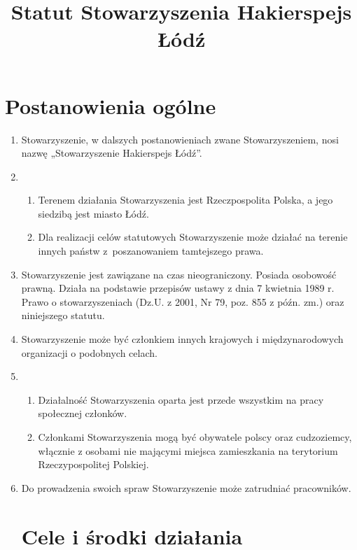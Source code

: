 \documentclass[chapterprefix,notitlepage]{article}
\begin{document}
\title{Statut Stowarzyszenia Hakierspejs Łódź}
\author{}
\date{}
\maketitle


\section{Postanowienia ogólne}

\begin{enumerate}

	\item Stowarzyszenie, w dalszych postanowieniach zwane Stowarzyszeniem, nosi nazwę „Stowarzyszenie Hakierspejs Łódź”.
	
	\item \begin{enumerate}
		\item Terenem działania Stowarzyszenia jest Rzeczpospolita Polska, a jego siedzibą jest miasto Łódź.
		\item Dla realizacji celów statutowych Stowarzyszenie może działać na terenie innych państw z~poszanowaniem tamtejszego prawa.
	\end{enumerate}
	
	\item Stowarzyszenie jest zawiązane na czas nieograniczony. Posiada osobowość prawną. Działa na podstawie przepisów ustawy z dnia 7 kwietnia 1989 r. Prawo o stowarzyszeniach (Dz.U. z 2001, Nr 79, poz. 855 z późn. zm.) oraz niniejszego statutu.
	
	\item Stowarzyszenie może być członkiem innych krajowych i międzynarodowych organizacji o podobnych celach.
	
	\item \begin{enumerate}
		\item Działalność Stowarzyszenia oparta jest przede wszystkim na pracy społecznej członków.
		\item Członkami Stowarzyszenia mogą być obywatele polscy oraz cudzoziemcy, włącznie z osobami nie mającymi miejsca zamieszkania na terytorium Rzeczypospolitej Polskiej.
	\end{enumerate}
	
	\item Do prowadzenia swoich spraw Stowarzyszenie może zatrudniać pracowników.
	
	
\section{Cele i środki działania}


\end{enumerate}
\end{document}

